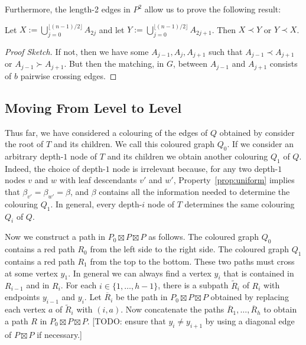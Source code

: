 \documentclass[kpfonts]{patmorin}
\newcommand{\pref}[1]{Property~\ref{prop:#1}}
\begin{document}
Furthermore, the length-2 edges in $P^2$ allow us to prove the following result:

\begin{lem}
    Let $X:=\bigcup_{j=0}^{\lfloor(n-1)/2\rfloor}{A_{2j}}$ and
    let $Y:=\bigcup_{j=0}^{\lfloor(n-1)/2\rfloor}{A_{2j+1}}$.  Then $X\prec Y$ or $Y\prec X$.
\end{lem}

\begin{proof}[Proof Sketch]
If not, then we have some $A_{j-1},A_{j},A_{j+1}$ such that $A_{j-1}\prec A_{j+1}$ or $A_{j-1}\succ A_{j+1}$.  But then the matching, in $G$, between $A_{j-1}$ and $A_{j+1}$ consists of $b$ pairwise crossing edges.
\end{proof}


\subsection{Moving From Level to Level}

Thus far, we have considered a colouring of the edges of $Q$ obtained by consider the root of $T$ and its children.  We call this coloured graph $Q_0$.  If we consider an arbitrary depth-$1$ node of $T$ and its children we obtain another colouring $Q_1$ of $Q$.  Indeed, the choice of depth-$1$ node is irrelevant because, for any two depth-$1$ nodes $v$ and $w$ with leaf descendants $v'$ and $w'$, \pref{uniform} implies that $\beta_{v'}=\beta_{w'}=\beta$, and $\beta$ contains all the information needed to determine the colouring $Q_1$.  In general, every depth-$i$ node of $T$ determines the same colouring $Q_i$ of $Q$.

Now we construct a path in $P_0\boxtimes P\boxtimes P$ as follows.  The coloured graph $Q_0$ contains a red path $R_0$ from the left side to the right side.  The coloured graph $Q_1$ contains a red path $R_1$ from the top to the bottom.  These two paths must cross at some vertex $y_1$.
In general we can always find a vertex $y_i$ that is contained in $R_{i-1}$ and in $R_i$. For each $i\in\{1,\ldots,h-1\}$, there is a subpath $\tilde{R}_i$ of $R_i$ with endpoints $y_{i-1}$ and $y_i$. Let $\overline{R}_i$ be the path in $P_0\boxtimes P\boxtimes P$ obtained by replacing each vertex $a$ of $\tilde{R}_i$ with $(i,a)$. Now concatenate the paths $\overline{R}_1,\ldots,\overline{R}_h$ to obtain a path $R$ in $P_0\boxtimes P\boxtimes P$.  [TODO: ensure that $y_i\neq y_{i+1}$ by using a diagonal edge of $P\boxtimes P$ if necessary.]
\end{document}

